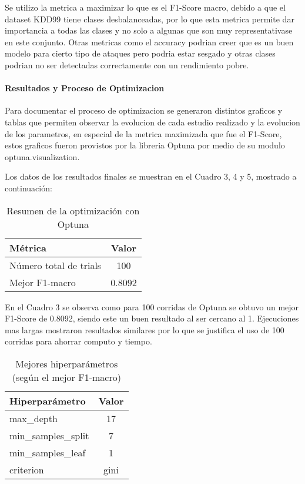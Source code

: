 \documentclass[12pt,a4paper]{article}
\begin{document}
Se utilizo la metrica a maximizar lo que es el F1-Score macro, debido a que el dataset KDD99 tiene clases desbalanceadas,
por lo que esta metrica permite dar importancia a todas las clases y no solo a algunas que son muy representativase
en este conjunto. Otras metricas como el accuracy podrian creer que es un buen modelo para cierto tipo de ataques
pero podria estar sesgado y otras clases podrian no ser detectadas correctamente con un rendimiento pobre.

\paragraph{Resultados y Proceso de Optimizacion}

Para documentar el proceso de optimizacion se generaron distintos graficos y tablas que permiten observar la evolucion de cada estudio
realizado y la evolucion de los parametros, en especial de la metrica maximizada que fue el F1-Score, estos
graficos fueron provistos por la libreria Optuna por medio de su modulo optuna.visualization.

Los datos de los resultados finales se muestran en el Cuadro 3, 4 y 5, mostrado a continuación:

\begin{table}[htbp]
  \centering
  \begin{tabular}{l c}
    \hline
    Métrica & Valor \\
    \hline
    Número total de trials & 100 \\
    Mejor F1-macro & 0.8092 \\
    \hline
  \end{tabular}
  \caption{Resumen de la optimización con Optuna}
  \label{tab:optuna_resumen}
\end{table}

En el Cuadro 3 se observa como para 100 corridas de Optuna se obtuvo un mejor F1-Score de 0.8092,
siendo este un buen resultado al ser cercano al 1. Ejecuciones mas largas mostraron resultados similares
por lo que se justifica el uso de 100 corridas para ahorrar computo y tiempo.

\begin{table}[htbp]
  \centering
  \begin{tabular}{l c}
    \hline
    Hiperparámetro & Valor \\
    \hline
    max\_depth & 17 \\
    min\_samples\_split & 7 \\
    min\_samples\_leaf & 1 \\
    criterion & gini \\
    \hline
  \end{tabular}
  \caption{Mejores hiperparámetros (según el mejor F1-macro)}
  \label{tab:optuna_mejores_hparams}
\end{table}
\end{document}
